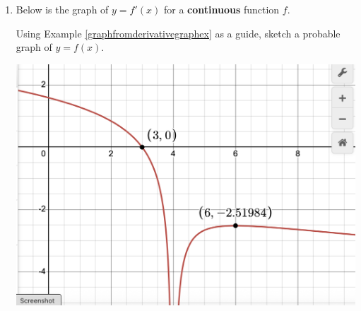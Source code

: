 \begin{enumerate}
\begin{enumerate}

\item  Determine the $x$-values where:

\begin{multicols}{2}

 $f(x) = 0$:
 
  $f'(x) = 0$:

\end{multicols}

\smallskip

\item List the open intervals over which:

\begin{multicols}{2}

 $f(x) > 0$:
 
  $f(x) < 0$:

\end{multicols}

\smallskip

\begin{multicols}{2}

 $f'(x) > 0$:
 
  $f'(x) < 0$:

\end{multicols}

\smallskip

\begin{multicols}{2}

 $f''(x) > 0$:
 
  $f''(x) < 0$:

\end{multicols}

\end{enumerate}


\item  Below is the graph of $y = f'(x)$ for a \textbf{continuous} function $f$.  

\smallskip

Using Example \ref{graphfromderivativegraphex} as a guide,  sketch a probable graph of $y = f(x)$.  

\begin{center}

\centerline{\includegraphics[width = 5in]{./AppDerivativesGraphics/graphfromderivativeexercise.png}}
\end{center}



\end{enumerate}
